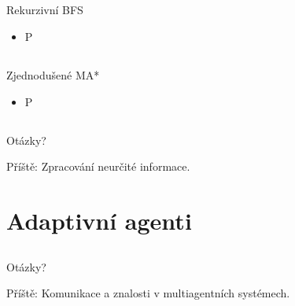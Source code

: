 \documentclass{beamer}
\begin{document}
\subsection{}
\begin{frame}{Rekurzivní BFS}
\begin{itemize}
\item P
\end{itemize}
\end{frame}

\subsection{}
\begin{frame}{Zjednodušené MA*}
\begin{itemize}
\item P
\end{itemize}
\end{frame}

\subsection{}
\begin{frame}{Otázky?}
\begin{center}
Příště: Zpracování neurčité informace.
\end{center}
\end{frame}

\section{Adaptivní agenti}

\subsection{}

\subsection{}
\begin{frame}{Otázky?}
\begin{center}
Příště: Komunikace a znalosti v multiagentních systémech.
\end{center}
\end{frame}
\end{document}
